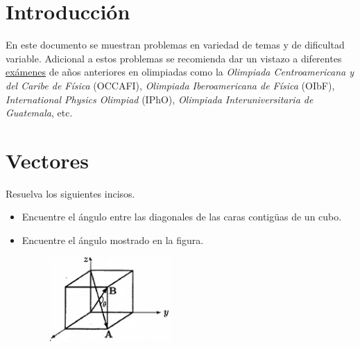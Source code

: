 \section*{Introducción}
En este documento se muestran problemas en variedad de temas y de dificultad variable. Adicional a estos problemas se recomienda dar un vistazo a diferentes \href{https://drive.google.com/drive/folders/17I-6L5ZBXA8nkakkQ815Gt2cxKC3Ai3m?usp=sharing}{exámenes} de años anteriores en olimpiadas como la \textit{Olimpiada Centroamericana y del Caribe de Física} (OCCAFI), \textit{Olimpiada Iberoamericana de Física} (OIbF), \textit{International Physics Olimpiad} (IPhO), \textit{Olimpiada Interuniversitaria de Guatemala}, etc.

\section*{Vectores}
\begin{ejercicio}
	Resuelva los siguientes incisos.
	\begin{itemize}
		\item Encuentre el ángulo entre las diagonales de las caras contigüas de un cubo.
		\begin{center}
			
		\end{center}
		\item Encuentre el ángulo mostrado en la figura.
		\begin{figure}[H]
			\centering
			\includegraphics[scale=0.5]{./img/cube.png}
		\end{figure}
	\end{itemize}
\end{ejercicio}



